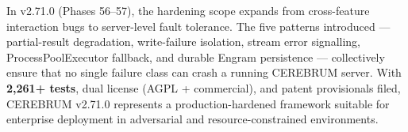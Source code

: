 In v2.71.0 (Phases 56--57), the hardening scope expands from cross-feature interaction bugs to server-level fault tolerance. The five patterns introduced --- partial-result degradation, write-failure isolation, stream error signalling, ProcessPoolExecutor fallback, and durable Engram persistence --- collectively ensure that no single failure class can crash a running CEREBRUM server. With \textbf{2,261+ tests}, dual license (AGPL + commercial), and patent provisionals filed, CEREBRUM v2.71.0 represents a production-hardened framework suitable for enterprise deployment in adversarial and resource-constrained environments.